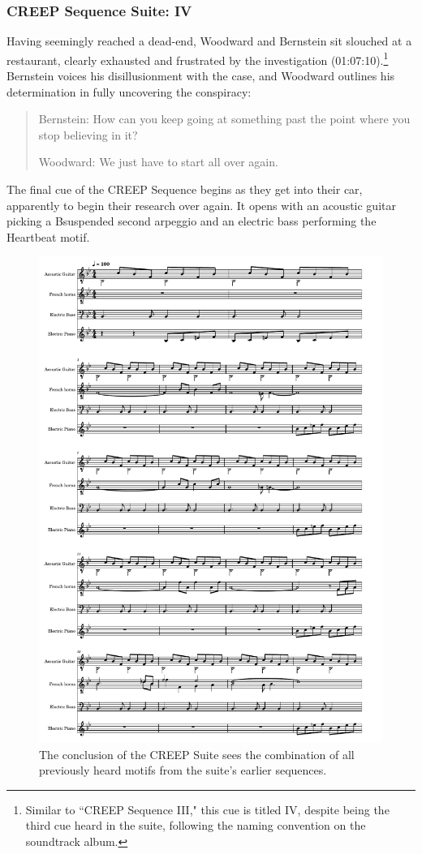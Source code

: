 \subsubsection{CREEP Sequence Suite: IV}

Having seemingly reached a dead-end, Woodward and Bernstein sit slouched at a restaurant, clearly exhausted and frustrated by the investigation (01:07:10).\footnote{Similar to ``CREEP Sequence III," this cue is titled IV, despite being the third cue heard in the suite, following the naming convention on the soundtrack album.}
Bernstein voices his disillusionment with the case, and Woodward outlines his determination in fully uncovering the conspiracy:
\begin{quote}
Bernstein: How can you keep going at something past the point where you stop believing in it?

Woodward: We just have to start all over again.
\end{quote}
The final cue of the CREEP Sequence begins as they get into their car, apparently to begin their research over again.
It opens with an acoustic guitar picking a B\flat suspended second arpeggio and an electric bass performing the Heartbeat motif.


\begin{figure}
    \centering
    \includegraphics[width=1\linewidth]{img/president-creep-4.pdf}
    \caption{The conclusion of the CREEP Suite sees the combination of all previously heard motifs from the suite's earlier sequences.}
    \label{fig:president-creep-4}
\end{figure}

